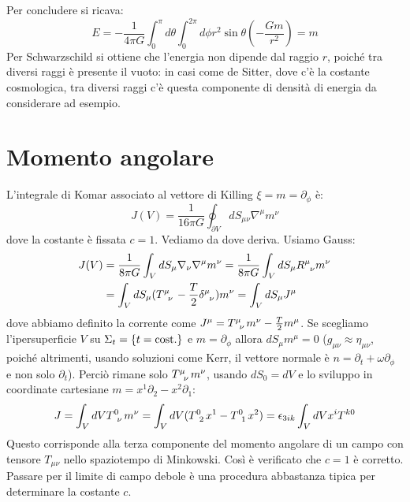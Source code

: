 Per concludere si ricava:
\begin{equation*}
    E = - \frac{1}{4\pi G}\int_0^\pi d\theta \int_0^{2\pi}d\phi r^2\sin\theta(- \frac{Gm}{r^2}) = m 
\end{equation*}
Per Schwarzschild si ottiene che l'energia non dipende dal raggio $r$, poiché tra diversi raggi è presente il vuoto: in casi come de Sitter, dove c'è la costante cosmologica, tra diversi raggi c'è questa componente di densità di energia da considerare ad esempio.
\section{Momento angolare}
L'integrale di Komar associato al vettore di Killing $\xi = m = \partial_\phi$ è:
\begin{equation}
    J(V) = \frac{1}{16\pi G} \oint_{\partial V} dS_{\mu\nu}\nabla^\mu m^\nu
    \label{eq.komar_mom_angolare}
\end{equation}
dove la costante è fissata $c=1$. Vediamo da dove deriva. Usiamo Gauss:
\begin{align*}
    J(V) &= \frac{1}{8\pi G} \int_V dS_\mu \nabla_\nu \nabla^\mu m^\nu = \frac{1}{8\pi G}\int_V dS_\mu \tensor{R}{^\mu_\nu}m^\nu \\
    &= \int_V dS_\mu (\tensor{T}{^\mu_\nu} - \frac{T}{2}\tensor{\delta}{^\mu_\nu})m^\nu = \int_V dS_\mu J^\mu
\end{align*}
dove abbiamo definito la corrente come $J^\mu = \tensor{T}{^\mu_\nu}m^\nu - \frac{T}{2}m^\mu$. Se scegliamo l'ipersuperficie $V$ su $ \Sigma_t = \{t=\textrm{cost.}\}$ e $m=\partial_\phi$ allora $dS_\mu m^\mu =0$ ($g_{\mu\nu} \approx \eta_{\mu\nu}$, poiché altrimenti, usando soluzioni come Kerr, il vettore normale è $n= \partial_t + \omega \partial_\phi$ e non solo $\partial_t$). Perciò rimane solo $\tensor{T}{^\mu_\nu}m^\nu$, usando $dS_0 = dV$ e lo sviluppo in coordinate cartesiane $m= x^1\partial_2 - x^2\partial_1$:
\begin{equation*}
J = \int_V dV \tensor{T}{^0_\nu}m^\nu = \int_V dV( \tensor{T}{^0_2}x^1 - \tensor{T}{^0_1}x^2) = \epsilon_{3ik}\int_V dV x^i T^{k0}
\end{equation*}
Questo corrisponde alla terza componente del momento angolare di un campo con tensore $T_{\mu\nu}$ nello spaziotempo di Minkowski. Così è verificato che $c=1$ è corretto. Passare per il limite di campo debole è una procedura abbastanza tipica per determinare la costante $c$.

